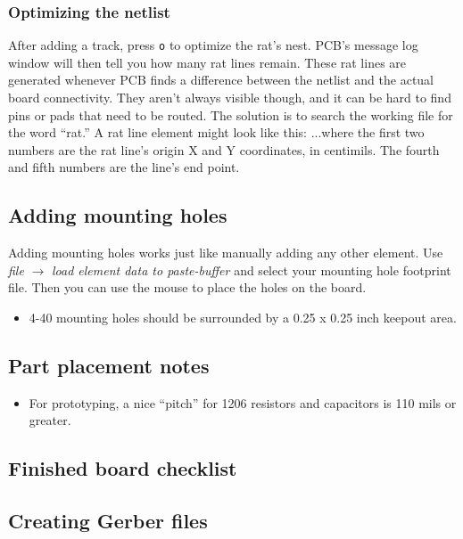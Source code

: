 \subsubsection{Optimizing the netlist}
After adding a track, press \texttt{o} to optimize the rat's nest.
PCB's message log window will then tell you how many rat lines remain.
These rat lines are generated whenever PCB finds a difference between
the netlist and the actual board connectivity.  They aren't always
visible though, and it can be hard to find pins or pads that need to
be routed.  The solution is to search the working file for the word
``rat.''  A rat line element might look like this:
...where the first two numbers are the rat line's origin X and Y
coordinates, in centimils.  The fourth and fifth numbers are the
line's end point.

\clearpage
\subsection{Adding mounting holes}
Adding mounting holes works just like manually adding any other
element.  Use \textsl{file} $\rightarrow$ \textsl{load element data to
  paste-buffer} and select your mounting hole footprint file.  Then
you can use the mouse to place the holes on the board.
\begin{itemize}
\item 4-40 mounting holes should be surrounded by a 0.25 x 0.25 inch
  keepout area.
\end{itemize}

\clearpage
\subsection{Part placement notes}

\begin{itemize}
\item For prototyping, a nice ``pitch'' for 1206 resistors and
  capacitors is 110 mils or greater.
\end{itemize}

\clearpage
\subsection{Finished board checklist}


\clearpage
\subsection{Creating Gerber files}



